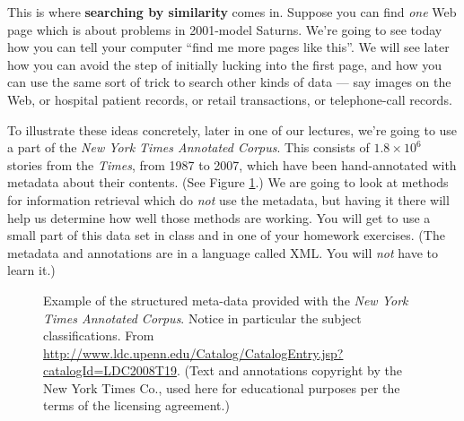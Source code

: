 \documentclass{article}
\begin{document}
This is where {\bf searching by similarity} comes in.  Suppose you can find
{\em one} Web page which is about problems in 2001-model Saturns.  We're going
to see today how you can tell your computer ``find me more pages like this''.
We will see later how you can avoid the step of initially lucking into the
first page, and how you can use the same sort of trick to search other kinds of
data --- say images on the Web, or hospital patient records, or retail
transactions, or telephone-call records.

To illustrate these ideas concretely, later in one of our lectures, we're going to use a part of the {\em New
  York Times Annotated Corpus}.  This consists
of $1.8 \times {10}^6$ stories from the {\em Times}, from 1987 to 2007, which
have been hand-annotated with metadata about their contents.  (See Figure
\ref{fig:nytannotated}.)  We are going to look at methods for information
retrieval which do {\em not} use the metadata, but having it there will help us
determine how well those methods are working.  You will get to use a small part
of this data set in class and in one of your homework exercises. (The metadata and annotations are in
  a language called XML.  You will {\em not} have to learn it.)

\begin{figure}
  \caption{Example of the structured meta-data provided with the {\em New York
      Times Annotated Corpus}.  Notice in particular the subject
    classifications.  From
    \url{http://www.ldc.upenn.edu/Catalog/CatalogEntry.jsp?catalogId=LDC2008T19}.
    (Text and annotations copyright by the New York Times Co., used here for
    educational purposes per the terms of the licensing agreement.)}
  \label{fig:nytannotated}
\end{figure}
\end{document}
